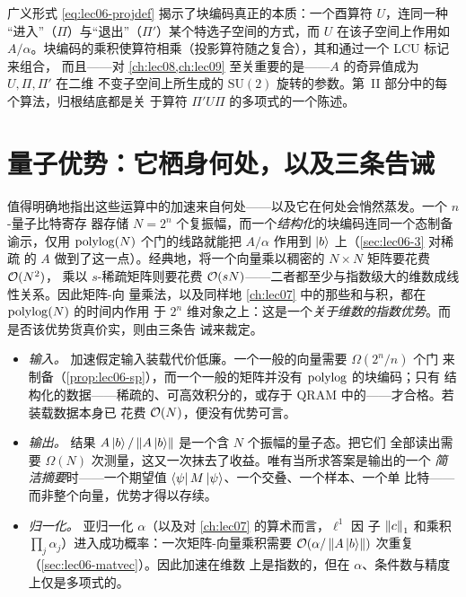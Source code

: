 \begin{remark}[为何投影形式才是正确的抽象]
\label{rem:lec06-abstraction}
广义形式 \eqref{eq:lec06-projdef} 揭示了块编码真正的本质：一个酉算符 $U$，连同一种
``进入''（$\Pi$）与``退出''（$\Pi'$）某个特选子空间的方式，而 $U$ 在该子空间上作用如
$A/\alpha$。块编码的乘积使算符相乘（投影算符随之复合），其和通过一个 LCU 标记来组合，
而且——对 \cref{ch:lec08,ch:lec09} 至关重要的是——$A$ 的奇异值成为 $U,\Pi,\Pi'$ 在二维
不变子空间上所生成的 $\mathrm{SU}(2)$ 旋转的参数。第~II 部分中的每个算法，归根结底都是关
于算符 $\Pi'U\Pi$ 的多项式的一个陈述。
\end{remark}

\section{量子优势：它栖身何处，以及三条告诫}
\label{sec:lec06-advantage}

值得明确地指出这些运算中的加速来自何处——以及它在何处会悄然蒸发。一个 $n$-量子比特寄存
器存储 $N=2^n$ 个复振幅，而一个\emph{结构化}的块编码连同一个态制备谕示，仅用
$\operatorname{polylog}(N)$ 个门的线路就能把 $A/\alpha$ 作用到 $\ket{b}$ 上（\cref{sec:lec06-3} 对稀疏
的 $A$ 做到了这一点）。经典地，将一个向量乘以稠密的 $N\times N$ 矩阵要花费 $\mathcal{O}(N^2)$，
乘以 $s$-稀疏矩阵则要花费 $\mathcal{O}(sN)$——二者都至少与指数级大的维数成线性关系。因此矩阵-向
量乘法，以及同样地 \cref{ch:lec07} 中的那些和与积，都在 $\operatorname{polylog}(N)$ 的时间内作用
于 $2^n$ 维对象之上：这是一个\emph{关于维数的指数优势}。而是否该优势货真价实，则由三条告
诫来裁定。

\begin{itemize}[leftmargin=1.4em,nosep]
  \item \emph{输入。} 加速假定输入装载代价低廉。一个一般的向量需要 $\Omega(2^n/n)$ 个门
        来制备（\cref{prop:lec06-sp}），而一个一般的矩阵并没有 $\operatorname{polylog}$ 的块编码；只有
        结构化的数据——稀疏的、可高效积分的，或存于 QRAM 中的——才合格。若装载数据本身已
        花费 $\mathcal{O}(N)$，便没有优势可言。
  \item \emph{输出。} 结果 $A\ket{b}/\left\lVert A\ket{b} \right\rVert$ 是一个含 $N$ 个振幅的量子态。把它们
        全部读出需要 $\Omega(N)$ 次测量，这又一次抹去了收益。唯有当所求答案是输出的一个
        \emph{简洁摘要}时——一个期望值 $\bra{\psi}M\ket{\psi}$、一个交叠、一个样本、一个单
        比特——而非整个向量，优势才得以存续。
  \item \emph{归一化。} 亚归一化 $\alpha$（以及对 \cref{ch:lec07} 的算术而言，$\ell^1$ 因
        子 $\left\lVert c \right\rVert_1$ 和乘积 $\prod_j\alpha_j$）进入成功概率：一次矩阵-向量乘积需要
        $\mathcal{O}(\alpha/\left\lVert A\ket{b} \right\rVert)$ 次重复（\cref{sec:lec06-matvec}）。因此加速在维数
        上是指数的，但在 $\alpha$、条件数与精度上仅是多项式的。
\end{itemize}

